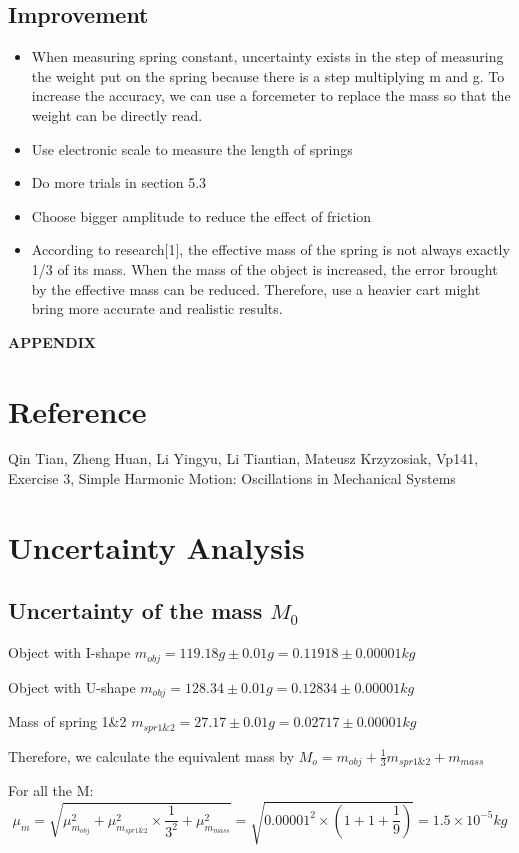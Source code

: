 \documentclass[12pt,a4paper]{article}
\begin{document}
\subsection{Improvement}
\begin{itemize}
    \item When measuring spring constant, uncertainty exists in the step of measuring the weight put on the spring because there is a step multiplying m and g. To increase the accuracy, we can use a forcemeter to replace the mass so that the weight can be directly read.
    \item Use electronic scale to measure the length of springs
    \item Do more trials in section 5.3   
    \item Choose bigger amplitude to reduce the effect of friction
    \item	According to research[1], the effective mass of the spring is not always exactly 1/3 of its mass. When the mass of the object is increased, the error brought by the effective mass can be reduced. Therefore, use a heavier cart might bring more accurate and realistic results.  
\end{itemize}


\newpage
{\LARGE\textbf{APPENDIX}}
\setcounter{section}{0}
\renewcommand\thesection{\Alph{section}}

\section{Reference}
Qin Tian, Zheng Huan, Li Yingyu, Li Tiantian, Mateusz Krzyzosiak, Vp141, Exercise 3, Simple Harmonic Motion:
Oscillations in Mechanical Systems

\section{Uncertainty Analysis}

\subsection{Uncertainty of the mass $M_0$}
Object with I-shape $m_{obj}=119.18g\pm0.01g=0.11918\pm0.00001kg$\par 
Object with U-shape $m_{obj}=128.34\pm0.01g=0.12834\pm0.00001kg$\par
Mass of spring 1\&2 $m_{spr1\&2}=27.17\pm0.01g=0.02717\pm0.00001kg$\par 
Therefore, we calculate the equivalent mass by $M_o=m_{obj}+\frac{1}{3}m_{spr1\&2}+m_{mass}$\par
For all the M:
$$ \mu_m=\sqrt{\mu_{m_{obj}}^2+\mu_{m_{spr1\&2}}^2\times \frac{1}{3^2}+\mu_{m_{mass}}^2}=\sqrt{0.00001^2\times (1+1+\frac{1}{9})}=1.5\times 10^{-5}kg$$
\end{document}
